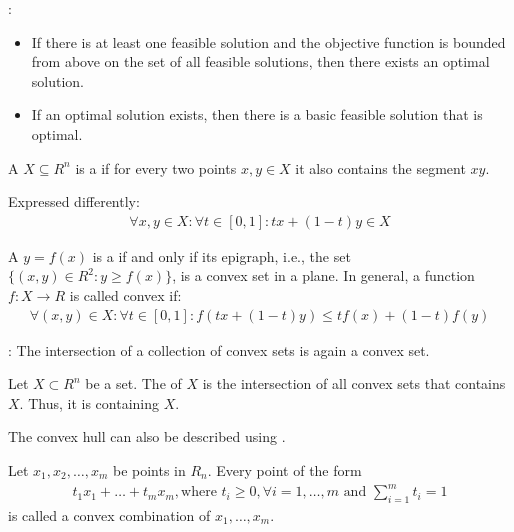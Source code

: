   \par {}:
    \begin{itemize}
      \item If there is at least one feasible solution and the objective function is bounded from above on the set of all feasible solutions, then there exists an optimal solution.
      \item If an optimal solution exists, then there is a basic feasible solution that is optimal.
    \end{itemize}

  \par {}

    \par A  $X \subseteq R^n$ is a  if for every two points $x, y \in X$ it also contains
the segment $xy$.
    \par Expressed differently:
    \begin{align*}
      \forall x, y \in X: \forall t \in [0, 1]: tx + (1 - t)y \in X
    \end{align*}

    \par A  $y = f(x)$ is a  if and only if its epigraph, i.e., the set $\{(x, y) \in R^2: y \geq f(x)\}$, is a convex set in a plane. In general, a function $f: X \to R$ is called convex if:
    \begin{align*}
       \forall (x, y) \in X: \forall t \in [0, 1]: f(tx + (1 - t)y) \leq tf(x) + (1 - t) f(y)
    \end{align*}

    \par {}: The intersection of a collection of convex sets is again a convex set.
    \par Let $X \subset R^n$ be a set. The  of $X$ is the intersection of all convex sets that contains $X$. Thus, it is  containing $X$.

    \par The convex hull can also be described using .
    \par Let $x_1, x_2, \ldots, x_m$ be points in $R_n$. Every point of the form
      \begin{align*}
        t_1 x_1 + \ldots + t_m x_m, \text{where } t_i \geq 0, \forall i = 1, \ldots, m \text{ and } \sum\limits_{i = 1}^m t_i = 1
      \end{align*}
      is called a convex combination of $x_1, \ldots, x_m$.

